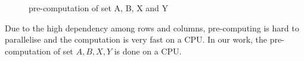\documentclass[10pt,journal,cspaper,compsoc]{IEEEtran}
\begin{document}
\begin{figure}[h]
\centering
{}
~~\\
~~
~~
\caption{pre-computation of set A, B, X and Y}\label{prec}
\end{figure}

Due to the high dependency among rows and columns, pre-computing is hard to parallelise and the computation is very fast on a CPU. In our work, the pre-computation of set $A, B, X, Y$ is done on a CPU.
\end{document}

